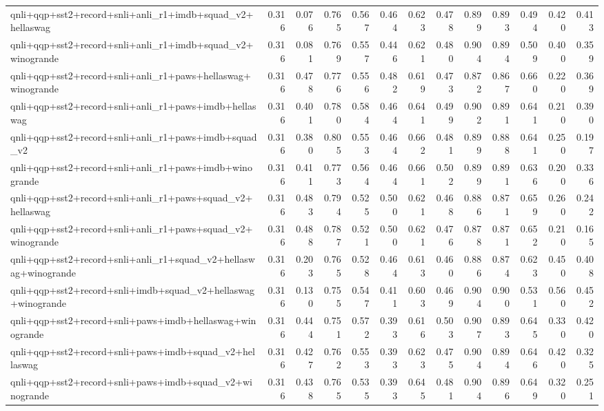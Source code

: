 \begin{table}[t]
\begin{tabular}{lrrrrrrrrrrrr}
    qnli+qqp+sst2+record+snli+anli\_r1+imdb+squad\_v2+hellaswag & 0.316 & 0.076 & 0.765 & 0.567 & 0.464 & 0.623 & 0.478 & 0.899 & 0.893 & 0.494 & 0.420 & 0.413 \\
    qnli+qqp+sst2+record+snli+anli\_r1+imdb+squad\_v2+winogrande & 0.316 & 0.081 & 0.769 & 0.557 & 0.446 & 0.621 & 0.480 & 0.904 & 0.894 & 0.509 & 0.400 & 0.359 \\
    qnli+qqp+sst2+record+snli+anli\_r1+paws+hellaswag+winogrande & 0.316 & 0.478 & 0.776 & 0.556 & 0.482 & 0.619 & 0.473 & 0.872 & 0.867 & 0.660 & 0.220 & 0.369 \\
    qnli+qqp+sst2+record+snli+anli\_r1+paws+imdb+hellaswag & 0.316 & 0.401 & 0.780 & 0.584 & 0.464 & 0.641 & 0.499 & 0.902 & 0.891 & 0.641 & 0.210 & 0.390 \\
    qnli+qqp+sst2+record+snli+anli\_r1+paws+imdb+squad\_v2 & 0.316 & 0.380 & 0.805 & 0.553 & 0.464 & 0.662 & 0.481 & 0.899 & 0.888 & 0.641 & 0.250 & 0.197 \\
    qnli+qqp+sst2+record+snli+anli\_r1+paws+imdb+winogrande & 0.316 & 0.411 & 0.773 & 0.564 & 0.464 & 0.661 & 0.502 & 0.899 & 0.891 & 0.636 & 0.200 & 0.336 \\
    qnli+qqp+sst2+record+snli+anli\_r1+paws+squad\_v2+hellaswag & 0.316 & 0.483 & 0.794 & 0.525 & 0.500 & 0.621 & 0.468 & 0.886 & 0.871 & 0.659 & 0.260 & 0.242 \\
    qnli+qqp+sst2+record+snli+anli\_r1+paws+squad\_v2+winogrande & 0.316 & 0.488 & 0.787 & 0.521 & 0.500 & 0.621 & 0.476 & 0.878 & 0.871 & 0.652 & 0.210 & 0.165 \\
    qnli+qqp+sst2+record+snli+anli\_r1+squad\_v2+hellaswag+winogrande & 0.316 & 0.203 & 0.765 & 0.528 & 0.464 & 0.613 & 0.460 & 0.886 & 0.874 & 0.623 & 0.450 & 0.408 \\
    qnli+qqp+sst2+record+snli+imdb+squad\_v2+hellaswag+winogrande & 0.316 & 0.130 & 0.755 & 0.547 & 0.411 & 0.603 & 0.469 & 0.904 & 0.900 & 0.531 & 0.560 & 0.452 \\
    qnli+qqp+sst2+record+snli+paws+imdb+hellaswag+winogrande & 0.316 & 0.444 & 0.751 & 0.572 & 0.393 & 0.616 & 0.503 & 0.907 & 0.893 & 0.645 & 0.330 & 0.420 \\
    qnli+qqp+sst2+record+snli+paws+imdb+squad\_v2+hellaswag & 0.316 & 0.427 & 0.762 & 0.553 & 0.393 & 0.623 & 0.475 & 0.904 & 0.894 & 0.646 & 0.420 & 0.325 \\
    qnli+qqp+sst2+record+snli+paws+imdb+squad\_v2+winogrande & 0.316 & 0.438 & 0.765 & 0.535 & 0.393 & 0.645 & 0.481 & 0.904 & 0.896 & 0.649 & 0.320 & 0.251 \\

\end{tabular}
\end{table}
